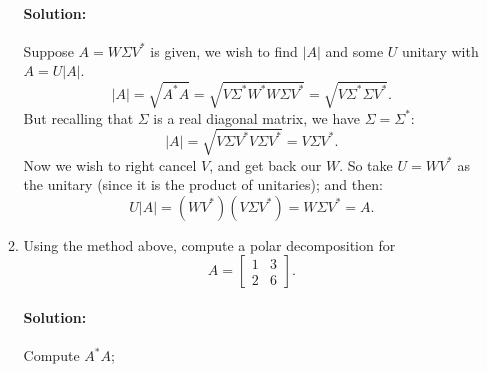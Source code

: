 \documentclass{article}
\begin{document}
\begin{enumerate}
\begin{enumerate}[label= (\alph*)]
    \paragraph{Solution: }Suppose $A=W\Sigma V ^* $ is given, we wish to find $|A|$ and some $U$ unitary with $A = U|A|$. 
    \[
    |A|=\sqrt{A^* A} =\sqrt{V\Sigma^* W^* W\Sigma V^* } =\sqrt{V\Sigma^* \Sigma V^* } 
    .\] 
    But recalling that $\Sigma$ is a real diagonal matrix, we have $\Sigma=\Sigma^* $:
    \[
    |A|=\sqrt{V\Sigma V^* V\Sigma V^* } =V\Sigma V^* 
    .\] 
    Now we wish to right cancel $V$, and get back our $W$. So take $U=WV^* $ as the unitary (since it is the product of unitaries); and then:
     \[
    U|A|=(WV^* )(V\Sigma V^* )=W\Sigma V^* =A
    .\] 

    \newpage
\item Using the method above, compute a polar decomposition for
\[
    A=\begin{bmatrix} 1&3\\2&6 \end{bmatrix} 
.\] 
\paragraph{Solution: }Compute $A^* A$;


\end{enumerate}
\end{enumerate}
\end{document}
